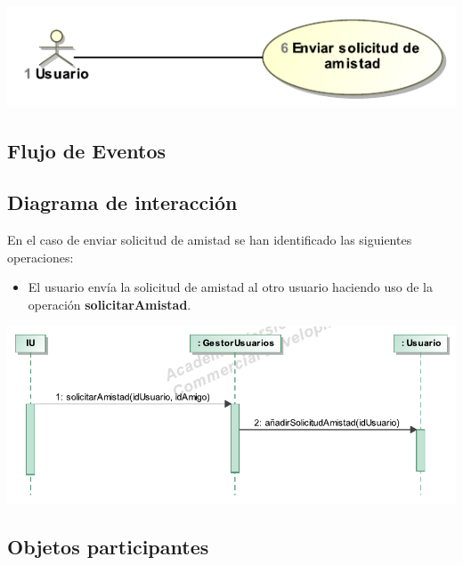 \documentclass[12pt, a4paper, titlepage]{article}
\begin{document}
\begin{center}
	\includegraphics{Imagenes/EnviarSolicitudAmistadCU.pdf}
\end{center}

\subsection{Flujo de Eventos}



\subsection{Diagrama de interacción}
En el caso de {\sc enviar solicitud de amistad } se han identificado las siguientes operaciones:

\begin{itemize}
	\item El usuario envía la solicitud de amistad al otro usuario haciendo uso de la operación \textbf{solicitarAmistad}.
\end{itemize}

\begin{center}
	\includegraphics{Imagenes/OperacionSolicitarAmistad}
\end{center}
\subsection{Objetos participantes}
\end{document}
